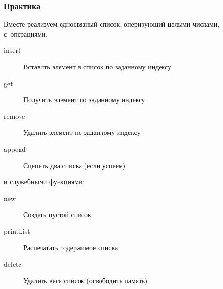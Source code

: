 \documentclass[aspectratio=169]{beamer}
\begin{document}
\begin{frame}
    \frametitle{Практика}

    Вместе реализуем односвязный список, оперирующий целыми числами, с~операциями:
    \begin{description}
        \item[insert] Вставить элемент в список по заданному индексу
        \item[get] Получить элемент по заданному индексу
        \item[remove] Удалить элемент по заданному индексу
        \item[append] Сцепить два списка (если успеем)
    \end{description}
    и служебными функциями:
    \begin{description}
        \item[new] Создать пустой список
        \item[printList] Распечатать содержимое списка
        \item[delete] Удалить весь список (освободить память)
    \end{description}


\end{frame}
\end{document}
